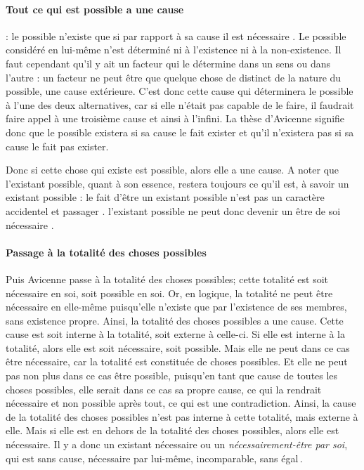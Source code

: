 \paragraph{Tout ce qui est possible a une cause} : le possible n'existe que si par rapport à sa cause il est nécessaire . Le possible considéré en lui-même n'est déterminé ni à l'existence ni à la non-existence. Il faut cependant qu'il y ait un facteur qui le détermine dans un sens ou dans l'autre : un facteur ne peut être que quelque chose de distinct de la nature du possible, une cause extérieure.
    C'est donc cette cause qui déterminera le possible à l'une des deux alternatives, car si elle n'était pas capable de le faire, il faudrait faire appel à une troisième cause et ainsi à l'infini. 
    La thèse d'Avicenne signifie donc que le possible existera si sa cause le fait exister et qu'il n'existera pas si sa cause le fait pas exister.
    
Donc si cette chose qui existe est possible, alors elle a une cause.  A noter que l'existant possible, quant à son essence, restera toujours ce qu'il est, à savoir un existant possible : le fait d'être un existant possible n'est pas un caractère accidentel et passager . l'existant possible ne peut donc devenir un être de soi nécessaire \cite[p. 52]{Avicenne:latinus}.
 
\paragraph{Passage à la totalité des choses possibles} Puis Avicenne passe à la totalité des choses possibles; cette totalité est soit nécessaire en soi, soit possible en soi. Or, en logique, la totalité ne peut être nécessaire en elle-même  puisqu'elle n'existe que par l'existence de ses membres, sans existence propre. Ainsi, la totalité des choses possibles a une cause.
Cette cause est soit interne à la totalité, soit externe à celle-ci.
Si elle est interne à la totalité, alors elle est soit nécessaire, soit possible.
Mais elle ne peut dans ce cas être nécessaire, car la totalité est constituée de choses possibles.
Et elle ne peut pas non plus dans ce cas être possible, puisqu'en tant que cause de toutes les choses possibles, elle serait dans ce cas sa propre cause, ce qui la rendrait nécessaire et non possible après tout, ce qui est une contradiction.
Ainsi, la cause de la totalité des choses possibles n'est pas interne à cette totalité, mais externe à elle.
Mais si elle est en dehors de la totalité des choses possibles, alors elle est nécessaire.
Il y a donc un existant nécessaire ou un \textit{nécessairement-être par soi}, qui est sans cause,  nécessaire par lui-même, incomparable, sans égal . 
 
